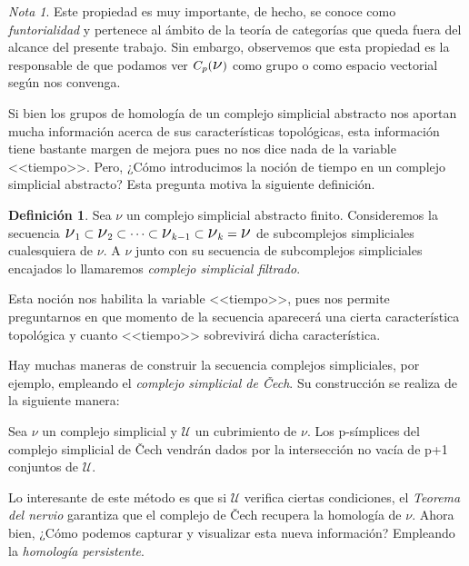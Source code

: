 \documentclass[12pt, a4paper]{article}
\numberwithin{equation}{section}
\theoremstyle{definition}
\newtheorem{defi}{Definición}
\theoremstyle{remark}
\newtheorem*{remark}{Nota}
\theoremstyle{plain}
\begin{document}
	\begin{remark}
		Este propiedad es muy importante, de hecho, se conoce como 
		\emph{funtorialidad} y pertenece al ámbito de la teoría de 
		categorías que queda fuera del alcance del presente trabajo. 
		Sin embargo, observemos que esta propiedad es la responsable 
		de que podamos ver $C_{p}(\text{{\Large $\nu$}})$ como grupo
		o como espacio vectorial según nos convenga.
	\end{remark}

	Si bien los grupos de homología de un complejo simplicial abstracto 
	nos aportan mucha información acerca de sus características 
	topológicas, esta información tiene bastante margen de mejora pues no
	nos dice nada de la variable <<tiempo>>. Pero, ¿Cómo introducimos la 
	noción de tiempo en un complejo simplicial abstracto? Esta pregunta
	motiva la siguiente definición.

	\begin{defi}
		Sea {\Large $\nu$} un complejo simplicial abstracto finito. 
		Consideremos la secuencia $ \text{{\Large $\nu$}$_{1}$} 
		\subset \text{{\Large $\nu$}$_{2}$} \subset \cdots \subset
		\text{{\Large $\nu$}$_{k-1}$} \subset 
		\text{{\Large $\nu$}$_{k}$} = \text{{\Large $\nu$}}$ de 
		subcomplejos simpliciales cualesquiera de {\Large $\nu$}. A
		{\Large $\nu$} junto con su secuencia de subcomplejos 
		simpliciales encajados lo llamaremos \textit{complejo 
		simplicial filtrado}. 
	\end{defi}

	Esta noción nos habilita la variable <<tiempo>>, pues nos permite 
	preguntarnos en que momento de la secuencia aparecerá una cierta 
	característica topológica y cuanto <<tiempo>> sobrevivirá dicha 
	característica.

	Hay muchas maneras de construir la secuencia complejos simpliciales, 
	por ejemplo, empleando el \emph{complejo simplicial de Čech}. Su 
	construcción se realiza de la siguiente manera:

	Sea {\Large $\nu$} un complejo simplicial y $\mathcal{U}$ un 
	cubrimiento de {\Large $\nu$}. Los p-símplices del complejo simplicial
	de Čech vendrán dados por la intersección no vacía de p+1 conjuntos de
	$\mathcal{U}$.

	Lo interesante de este método es que si $\mathcal{U}$ verifica ciertas
	condiciones, el \emph{Teorema del nervio} garantiza que el complejo de
	Čech recupera la homología de {\Large $\nu$}. Ahora bien, ¿Cómo 
	podemos capturar y visualizar esta nueva información? Empleando la 
	\emph{homología persistente}.
\end{document}
